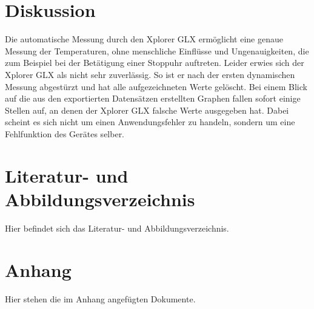 \documentclass[11pt]{article}
\begin{document}
\section{Diskussion}
Die automatische Messung durch den Xplorer GLX ermöglicht eine genaue Messung der Temperaturen, ohne menschliche Einflüsse und Ungenauigkeiten, die zum Beispiel bei der Betätigung einer Stoppuhr auftreten. Leider erwies sich der Xplorer GLX als nicht sehr zuverlässig. So ist er nach der ersten dynamischen Messung abgestürzt und hat alle aufgezeichneten Werte gelöscht.
Bei einem Blick auf die aus den exportierten Datensätzen erstellten Graphen fallen sofort einige Stellen auf, an denen der Xplorer GLX falsche Werte ausgegeben hat. Dabei scheint es sich nicht um einen Anwendungsfehler zu handeln, sondern um eine Fehlfunktion des Gerätes selber.
\section{Literatur- und Abbildungsverzeichnis}
Hier befindet sich das Literatur- und Abbildungsverzeichnis.
\section{Anhang}
Hier stehen die im Anhang angefügten Dokumente.
\end{document}
